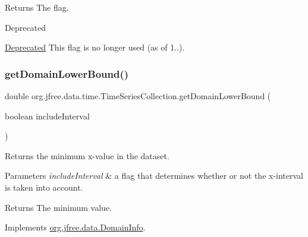\begin{DoxyReturn}{Returns}
The flag.
\end{DoxyReturn}
\begin{DoxyRefDesc}{Deprecated}
\item[\mbox{\hyperlink{deprecated__deprecated000282}{Deprecated}}]This flag is no longer used (as of 1..). \end{DoxyRefDesc}
\mbox{\label{classorg_1_1jfree_1_1data_1_1time_1_1_time_series_collection_a83943a7efe069eddacb00364bbcef030}} 
\subsubsection{\texorpdfstring{get\+Domain\+Lower\+Bound()}{getDomainLowerBound()}}
{\footnotesize\ttfamily double org.\+jfree.\+data.\+time.\+Time\+Series\+Collection.\+get\+Domain\+Lower\+Bound (\begin{DoxyParamCaption}\item[{boolean}]{include\+Interval }\end{DoxyParamCaption})}

Returns the minimum x-\/value in the dataset.


\begin{DoxyParams}{Parameters}
{\em include\+Interval} & a flag that determines whether or not the x-\/interval is taken into account.\\
\hline
\end{DoxyParams}
\begin{DoxyReturn}{Returns}
The minimum value. 
\end{DoxyReturn}


Implements \mbox{\hyperlink{interfaceorg_1_1jfree_1_1data_1_1_domain_info_ae1b4d9d415fe0a79bd2ce0f6e0a3f489}{org.\+jfree.\+data.\+Domain\+Info}}.

\mbox{\label{classorg_1_1jfree_1_1data_1_1time_1_1_time_series_collection_add31c4755cd5492cdc1a6e3055530467}} 
